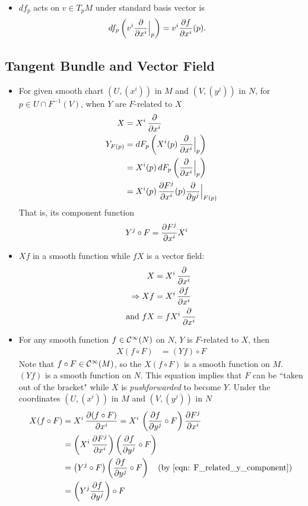 \documentclass[11pt]{article}
\begin{document}
\begin{itemize}
\item $df_p$ acts on $v \in T_{p}M$ under standard basis vector is
\begin{align}
df_p\left(v^i \frac{\partial }{ \partial x^i}\Bigr|_{p}\right) &= v^i \frac{\partial f}{ \partial x^i}(p).
\end{align}
\end{itemize}

\subsection{Tangent Bundle and Vector Field}
\begin{itemize}
\item  For given smooth chart $(U, (x^i))$ in $M$ and $(V, (y^j))$ in $N$, for $p \in U \cap F^{-1}(V)$, when $Y$ are $F$-related to $X$
\begin{align}
X &= X^i\, \frac{\partial }{ \partial x^i} \nonumber\\
Y_{F(p)} &= dF_p\left(X^i(p)\, \frac{\partial }{ \partial x^i}\Bigr|_{p} \right) \nonumber\\
&= X^i(p)\, dF_p\left(\frac{\partial }{ \partial x^i}\Bigr|_{p} \right)\nonumber\\
&= X^i(p)\, \frac{\partial F^{j}}{ \partial x^i}(p)\frac{\partial }{ \partial y^j}\Bigr|_{F(p)} \label{eqn: F_related_coordinate}
\end{align} That  is, its component function 
\begin{align}
Y^j \circ F&= \frac{\partial F^{j}}{ \partial x^i}X^i  \label{eqn: F_related_y_component}
\end{align} 

\item $Xf$ in a smooth function while $fX$ is a vector field:
\begin{align*}
X &= X^i\, \frac{\partial }{ \partial x^i} \\
\Rightarrow Xf &= X^i\, \frac{\partial f}{ \partial x^i}\\
\text{and } fX &= fX^i\,\frac{\partial }{ \partial x^i}
\end{align*}

\item For any smooth function $f \in {\mathcal C}^{\infty}(N)$ on $N$, $Y$ is $F$-related to $X$, then 
\begin{align*}
X(f \circ F) &= (Yf) \circ F
\end{align*} Note that $f\circ F \in {\mathcal C}^{\infty}(M)$, so the $X(f\circ F)$ is a smooth function on $M$. $(Yf)$ is a smooth function on $N$. This equation implies that $F$ can be ``taken out of the bracket" while $X$ is \emph{pushforwarded} to become $Y$. Under the coordinates $(U, (x^i))$ in $M$ and $(V, (y^j))$ in $N$
\begin{align}
X(f \circ F) &= X^i\, \frac{\partial (f \circ F)}{ \partial x^i} = X^i\,\left(\frac{\partial f}{ \partial y^j}\circ F\right)\frac{\partial F^j}{ \partial x^i} \nonumber\\
&=\left(X^i\,\frac{\partial F^j}{ \partial x^i}\right) \left(\frac{\partial f}{ \partial y^j}\circ F\right) \nonumber\\
&=\left(Y^j \circ F\right)\left(\frac{\partial f}{ \partial y^j}\circ F\right) \quad (\text{by }\eqref{eqn: F_related_y_component}) \nonumber\\
&= \left(Y^j  \frac{\partial f}{ \partial y^j}\right)\circ F \label{eqn: F_related_composite}
\end{align}


\end{itemize}
\end{document}
